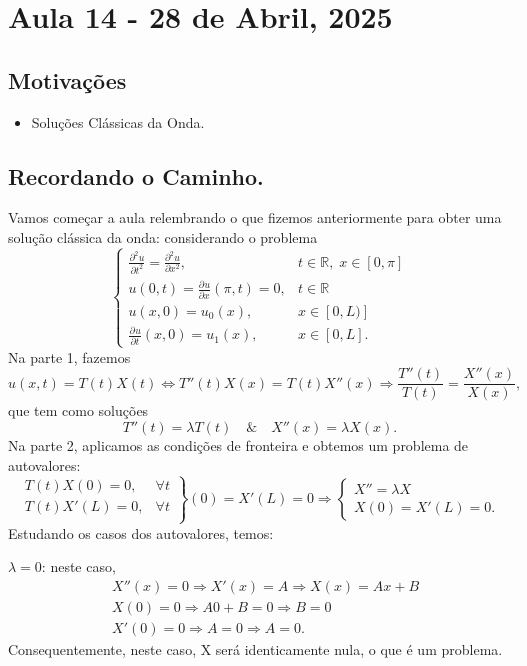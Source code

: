 \documentclass[../pde_notes.tex]{subfiles}
\begin{document}
\section{Aula 14 - 28 de Abril, 2025}
\subsection{Motivações}
\begin{itemize}
	\item Soluções Clássicas da Onda.
\end{itemize}
\subsection{Recordando o Caminho.}
Vamos começar a aula relembrando o que fizemos anteriormente para obter uma solução clássica da onda: considerando o problema
\[
	\left\{\begin{array}{ll}
		\frac{\partial^{2}u}{\partial t^{2}} = \frac{\partial^{2}u}{\partial x^{2}}, & t\in \mathbb{R},\; x\in [0, \pi ] \\
		u(0, t) = \frac{\partial^{}u}{\partial x^{}}(\pi , t) = 0,                   & t\in \mathbb{R}                   \\
		u(x, 0) = u_{0}(x),                                                          & x\in [0, L)]                      \\
		\frac{\partial^{}u}{\partial t^{}}(x,0) = u_1(x),                            & x\in [0, L].
	\end{array}\right.
\]
Na parte 1, fazemos
\[
	u(x, t) = T(t) X(t) \Leftrightarrow T''(t)X(x) = T(t)X''(x) \Rightarrow \frac{T''(t)}{T(t)} = \frac{X''(x)}{X(x)},
\]
que tem como soluções
\[
	T''(t) = \lambda T(t) \quad\&\quad X''(x) = \lambda X(x).
\]
Na parte 2, aplicamos as condições de fronteira e obtemos um problema de autovalores:
\[
	\left.\begin{array}{ll}
		T(t)X(0) = 0,  & \forall t \\
		T(t)X'(L) = 0, & \forall t \\
	\end{array}\right\} (0) = X'(L) = 0 \Rightarrow \left\{\begin{array}{ll}
		X'' = \lambda X \\
		X(0) = X'(L) = 0.
	\end{array}\right.
\]
Estudando os casos dos autovalores, temos:

\underline{\(\lambda = 0\)}: neste caso,
\begin{align*}
	 & X''(x) = 0 \Rightarrow X'(x) = A \Rightarrow X(x)=Ax + B \\
	 & X(0) = 0 \Rightarrow A0 + B = 0 \Rightarrow B = 0        \\
	 & X'(0) = 0 \Rightarrow A = 0 \Rightarrow A = 0.
\end{align*}
Consequentemente, neste caso, X será identicamente nula, o que é um problema.
\end{document}
